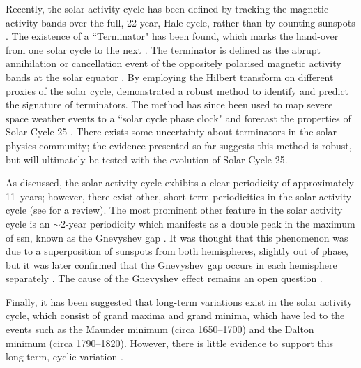 Recently, the solar activity cycle has been defined by tracking the magnetic activity bands over the full, 22-year, Hale cycle, rather than by counting sunspots \citep{leamon_timing_2020}. The existence of a ``Terminator" has been found, which marks the hand-over from one solar cycle to the next \citep{mcintosh_deciphering_2014, mcintosh_what_2019}. The terminator is defined as the abrupt annihilation or cancellation event of the oppositely polarised magnetic activity bands at the solar equator \citep{mcintosh_what_2019}. By employing the Hilbert transform on different proxies of the solar cycle, \citet{leamon_timing_2020} demonstrated a robust method to identify and predict the signature of terminators. The method has since been used to map severe space weather events to a ``solar cycle phase clock" \citep{chapman_quantifying_2020} and forecast the properties of Solar Cycle 25 \citep{mcintosh_overlapping_2020}. There exists some uncertainty about terminators in the solar physics community; the evidence presented so far suggests this method is robust, but will ultimately be tested with the evolution of Solar Cycle 25.


As discussed, the solar activity cycle exhibits a clear periodicity of approximately 11~years; however, there exist other, short-term periodicities in the solar activity cycle (see \citet{hathaway_solar_2015} for a review). The most prominent other feature in the solar activity cycle is an $\sim$2-year periodicity which manifests as a double peak in the maximum of \gls{ssn}, known as the Gnevyshev gap \citep{gnevyshev_corona_1963, gnevyshev_11-years_1967}. It was thought that this phenomenon was due to a superposition of sunspots from both hemispheres, slightly out of phase, but it was later confirmed that the Gnevyshev gap occurs in each hemisphere separately \citep{norton_solar-cycle_2009}. The cause of the Gnevyshev effect remains an open question \citep{hathaway_solar_2015}.

Finally, it has been suggested that long-term variations exist in the solar activity cycle, which consist of grand maxima and grand minima, which have led to the events such as the Maunder minimum (circa 1650--1700) and the Dalton minimum (circa 1790--1820). However, there is little evidence to support this long-term, cyclic variation \citep{hathaway_solar_2015}.



